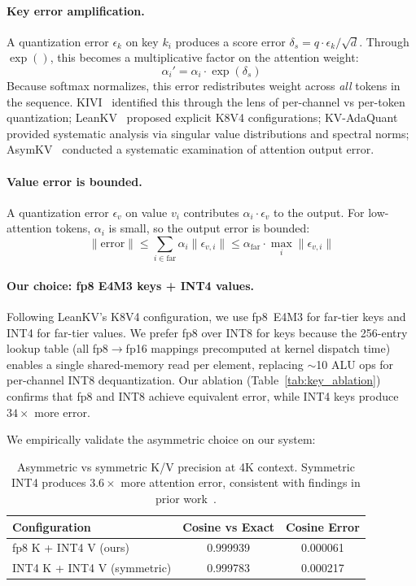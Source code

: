 \documentclass{article}
\begin{document}
\paragraph{Key error amplification.}
A quantization error $\epsilon_k$ on key $k_i$ produces a score error
$\delta_s = q \cdot \epsilon_k / \sqrt{d}$. Through $\exp()$, this
becomes a multiplicative factor on the attention weight:
\begin{equation}
  \alpha_i' = \alpha_i \cdot \exp(\delta_s)
\end{equation}
Because softmax normalizes, this error redistributes weight across
\emph{all} tokens in the sequence. KIVI~\cite{kivi} identified this
through the lens of per-channel vs per-token quantization;
LeanKV~\cite{leankv} proposed explicit K8V4 configurations;
KV-AdaQuant~\cite{kvadaquant} provided systematic analysis via singular
value distributions and spectral norms; AsymKV~\cite{asymkv} conducted
a systematic examination of attention output error.

\paragraph{Value error is bounded.}
A quantization error $\epsilon_v$ on value $v_i$ contributes
$\alpha_i \cdot \epsilon_v$ to the output. For low-attention tokens,
$\alpha_i$ is small, so the output error is bounded:
\begin{equation}
  \|\text{error}\| \leq \sum_{i \in \text{far}} \alpha_i \|\epsilon_{v,i}\| \leq \alpha_{\text{far}} \cdot \max_i \|\epsilon_{v,i}\|
\end{equation}

\paragraph{Our choice: fp8 E4M3 keys + INT4 values.}
Following LeanKV's K8V4 configuration, we use fp8~E4M3 for far-tier
keys and INT4 for far-tier values. We prefer fp8 over INT8 for keys
because the 256-entry lookup table (all fp8$\to$fp16 mappings
precomputed at kernel dispatch time) enables a single shared-memory read
per element, replacing $\sim$10 ALU ops for per-channel INT8
dequantization. Our ablation (Table~\ref{tab:key_ablation}) confirms
that fp8 and INT8 achieve equivalent error, while INT4 keys produce
$34\times$ more error.

We empirically validate the asymmetric choice on our system:

\begin{table}[h]
\centering
\begin{tabular}{lcc}
\toprule
Configuration & Cosine vs Exact & Cosine Error \\
\midrule
fp8 K + INT4 V (ours) & 0.999939 & 0.000061 \\
INT4 K + INT4 V (symmetric) & 0.999783 & 0.000217 \\
\bottomrule
\end{tabular}
\caption{Asymmetric vs symmetric K/V precision at 4K context.
Symmetric INT4 produces $3.6\times$ more attention error, consistent
with findings in prior work~\cite{leankv, kvadaquant}.}
\label{tab:asymmetric}
\end{table}
\end{document}

